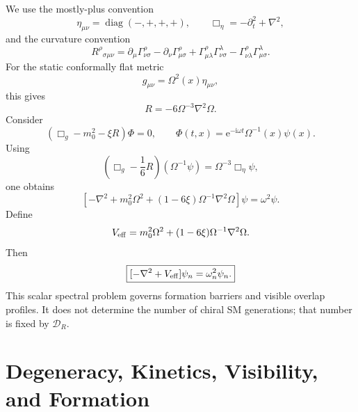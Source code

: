 \documentclass[aps,prd,preprint,notitlepage,nofootinbib,superscriptaddress,floatfix]{revtex4-2}
\newcommand{\ee}{\mathrm{e}}
\newcommand{\ii}{\mathrm{i}}
\newcommand{\diag}{\operatorname{diag}}
\newcommand{\scrD}{\mathscr D}
\theoremstyle{remark}
\begin{document}
We use the mostly-plus convention \cite{Nakahara2003,BirrellDavies1982}
\begin{equation}
\eta_{\mu\nu}=\diag(-,+,+,+),
\qquad
\Box_\eta=-\partial_t^2+\nabla^2,
\label{eq:signature}
\end{equation}
and the curvature convention
\begin{equation}
R^\rho{}_{\sigma\mu\nu}
=
\partial_\mu\Gamma^\rho_{\nu\sigma}
-\partial_\nu\Gamma^\rho_{\mu\sigma}
+\Gamma^\rho_{\mu\lambda}\Gamma^\lambda_{\nu\sigma}
-\Gamma^\rho_{\nu\lambda}\Gamma^\lambda_{\mu\sigma}.
\label{eq:curvature_convention}
\end{equation}
For the static conformally flat metric
\begin{equation}
g_{\mu\nu}=\Omega^2(x)\eta_{\mu\nu},
\end{equation}
this gives
\begin{equation}
R=-6\Omega^{-3}\nabla^2\Omega.
\label{eq:Ricci_scalar}
\end{equation}
Consider
\begin{equation}
(\Box_g-m_0^2-\xi R)\Phi=0,
\qquad
\Phi(t,x)=\ee^{-\ii\omega t}\Omega^{-1}(x)\psi(x).
\end{equation}
Using
\begin{equation}
\left(\Box_g-\frac16R\right)(\Omega^{-1}\psi)
=
\Omega^{-3}\Box_\eta\psi,
\end{equation}
one obtains
\begin{equation}
\left[
-\nabla^2
+m_0^2\Omega^2
+(1-6\xi)\Omega^{-1}\nabla^2\Omega
\right]\psi
=
\omega^2\psi.
\label{eq:scalar_operator_derived}
\end{equation}
Define
\begin{equation}
V_{\rm eff}
=
m_0^2\Omega^2
+(1-6\xi)\Omega^{-1}\nabla^2\Omega.
\label{eq:Veff}
\end{equation}
Then
\begin{equation}
\boxed{
[-\nabla^2+V_{\rm eff}]\psi_n=\omega_n^2\psi_n.
}
\label{eq:schrodinger}
\end{equation}
This scalar spectral problem governs formation barriers and visible overlap profiles.
It does not determine the number of chiral SM generations; that number is fixed by \(\scrD_R\).

\section{Degeneracy, Kinetics, Visibility, and Formation}
\label{sec:probability_modules}
\end{document}
